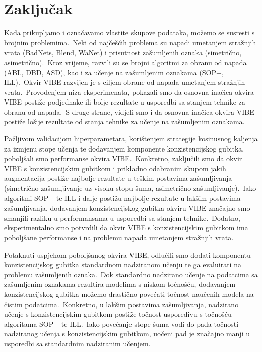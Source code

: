 \documentclass[diplomskirad]{fer}
\begin{document}
\chapter{Zaključak}
\label{pog:zakljucak}

Kada prikupljamo i označavamo vlastite skupove podataka, možemo se susresti s brojnim problemima.\ Neki od najčešćih problema su napadi umetanjem stražnjih vrata (BadNets, Blend, WaNet) i prisutnost zašumljenih oznaka (simetrično, asimetrično).\ 
Kroz vrijeme, razvili su se brojni algoritmi za obranu od napada (ABL, DBD, ASD), kao i za učenje na zašumljenim oznakama (SOP+, ILL).\ Okvir VIBE razvijen je s ciljem obrane od napada umetanjem stražnjih vrata.\ 
Provođenjem niza eksperimenata, pokazali smo da osnovna inačica okvira VIBE postiže podjednake ili bolje rezultate u usporedbi sa stanjem tehnike za obranu od napada.\ 
S druge strane, vidjeli smo i da osnovna inačica okvira VIBE postiže lošije rezultate od stanja tehnike za učenje na zašumljenim oznakama.\ 

Pažljivom validacijom hiperparametara, korištenjem strategije kosinusnog kaljenja za izmjenu stope učenja te dodavanjem komponente konzistencijskog gubitka, poboljšali smo performanse okvira VIBE.\ 
Konkretno, zaključili smo da okvir VIBE s konzistencijskim gubitkom i prikladno odabranim skupom jakih augmentacija postiže najbolje rezultate u teškim postavima zašumljivanja (simetrično zašumljivanje uz visoku stopu šuma, asimetrično zašumljivanje).\ 
Iako algoritmi SOP+ te ILL i dalje postižu najbolje rezultate u lakšim postavima zašumljivanja, dodavanjem konzistencijskog gubitka okviru VIBE značajno smo smanjili razliku u performansama u usporedbi sa stanjem tehnike.\ 
Dodatno, eksperimentalno smo potvrdili da okvir VIBE s konzistencijskim gubitkom ima poboljšane performanse i na problemu napada umetanjem stražnjih vrata.\ 

Potaknuti uspjehom poboljšanog okvira VIBE, odlučili smo dodati komponentu konzistencijskog gubitka standardnom nadziranom učenju te ga evaluirati na problemu zašumljenih oznaka.\ 
Dok standardno nadzirano učenje na podatcima sa zašumljenim oznakama rezultira modelima s niskom točnošću, dodavanjem konzistencijskog gubitka možemo drastično povećati točnost naučenih modela na čistim podatcima.\ 
Konkretno, u lakšim postavima zašumljivanja, nadzirano učenje s konzistencijskim gubitkom postiže točnost usporedivu s točnošću algoritama SOP+ te ILL.\ 
Iako povećanje stope šuma vodi do pada točnosti nadziranog učenja s konzistencijskim gubitkom, uočeni pad je značajno manji u usporedbi sa standardnim nadziranim učenjem.\ 
\end{document}
